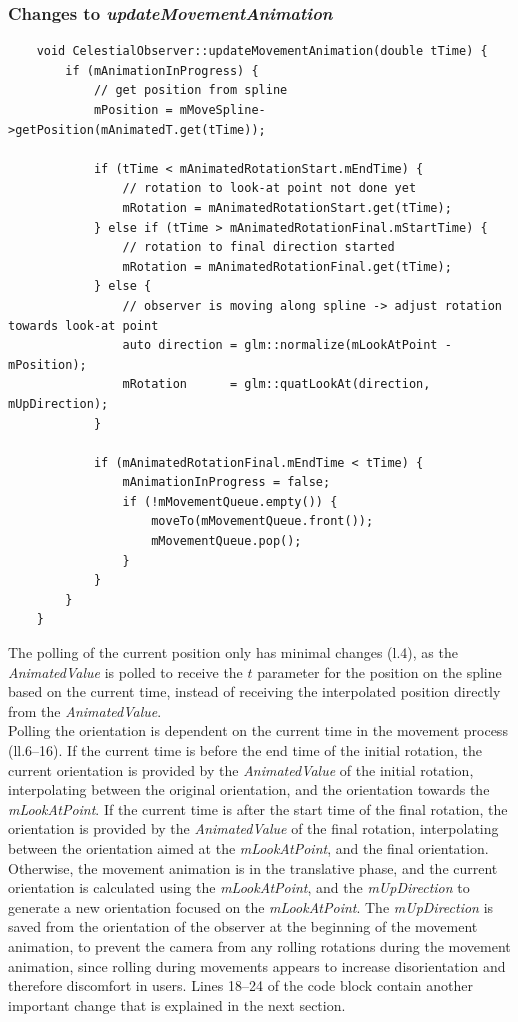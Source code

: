 \subsubsection{Changes to \textit{updateMovementAnimation}}\label{subsubsec:changes-to-updatemovementanimation}

\begin{verbatim}
    void CelestialObserver::updateMovementAnimation(double tTime) {
        if (mAnimationInProgress) {
            // get position from spline
            mPosition = mMoveSpline->getPosition(mAnimatedT.get(tTime));

            if (tTime < mAnimatedRotationStart.mEndTime) {
                // rotation to look-at point not done yet
                mRotation = mAnimatedRotationStart.get(tTime);
            } else if (tTime > mAnimatedRotationFinal.mStartTime) {
                // rotation to final direction started
                mRotation = mAnimatedRotationFinal.get(tTime);
            } else {
                // observer is moving along spline -> adjust rotation towards look-at point
                auto direction = glm::normalize(mLookAtPoint - mPosition);
                mRotation      = glm::quatLookAt(direction, mUpDirection);
            }

            if (mAnimatedRotationFinal.mEndTime < tTime) {
                mAnimationInProgress = false;
                if (!mMovementQueue.empty()) {
                    moveTo(mMovementQueue.front());
                    mMovementQueue.pop();
                }
            }
        }
    }
\end{verbatim}
The polling of the current position only has minimal changes (l.\@4), as the \textit{AnimatedValue}
is polled to receive the $t$ parameter for the position on the spline based on the current time, instead of receiving
the interpolated position directly from the \textit{AnimatedValue}.
\\
Polling the orientation is dependent on the current time in the movement process (ll.\@6--16).
If the current time is before the end time of the initial rotation, the current orientation is provided by the
\textit{AnimatedValue} of the initial rotation, interpolating between the original orientation, and the orientation
towards the \textit{mLookAtPoint}.
If the current time is after the start time of the final rotation, the orientation is provided by the
\textit{AnimatedValue} of the final rotation, interpolating between the orientation aimed at the
\textit{mLookAtPoint}, and the final orientation.
Otherwise, the movement animation is in the translative phase, and the current orientation is calculated using the 
\textit{mLookAtPoint}, and the \textit{mUpDirection} to generate a new orientation focused on the \textit{mLookAtPoint}.
The \textit{mUpDirection} is saved from the orientation of the observer at the beginning of the movement animation,
to prevent the camera from any rolling rotations during the movement animation, since rolling during movements
appears to increase disorientation and therefore discomfort in users.
Lines 18--24 of the code block contain another important change that is explained in the next section.

